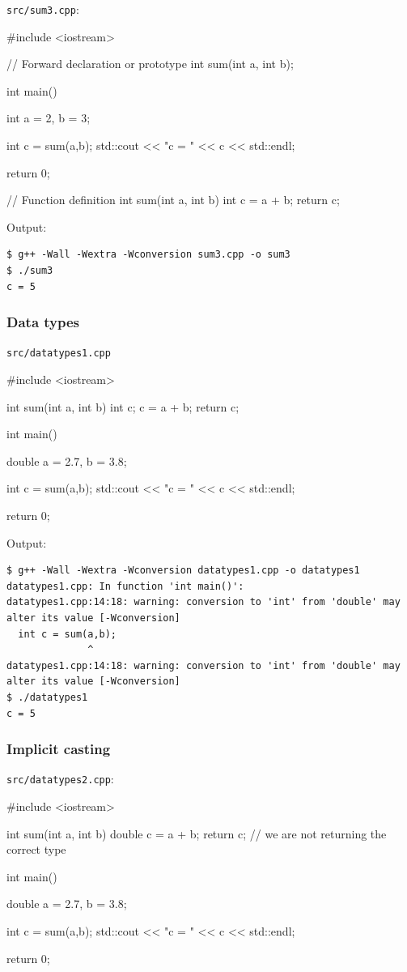 \documentclass[12pt,letterpaper,twoside]{article}
\begin{document}
\texttt{src/sum3.cpp}:

\begin{cpp}
#include <iostream>

// Forward declaration or prototype
int sum(int a, int b);

int main() {
  int a = 2, b = 3;
  
  int c = sum(a,b);
  std::cout << "c = " << c << std::endl;
  
  return 0;
}

// Function definition
int sum(int a, int b) {
  int c = a + b;
  return c;
}
\end{cpp}

Output:

\begin{verbatim}
$ g++ -Wall -Wextra -Wconversion sum3.cpp -o sum3
$ ./sum3
c = 5
\end{verbatim}

\subsubsection{Data types}
\texttt{src/datatypes1.cpp}

\begin{cpp}
#include <iostream>

int sum(int a, int b) {
  int c;
  c = a + b;
  return c;
}

int main() {
  double a = 2.7, b = 3.8;

  int c = sum(a,b);
  std::cout << "c = " << c << std::endl;

  return 0;
}
\end{cpp}

Output:

\begin{verbatim}
$ g++ -Wall -Wextra -Wconversion datatypes1.cpp -o datatypes1
datatypes1.cpp: In function 'int main()':
datatypes1.cpp:14:18: warning: conversion to 'int' from 'double' may alter its value [-Wconversion]
  int c = sum(a,b);
              ^
datatypes1.cpp:14:18: warning: conversion to 'int' from 'double' may alter its value [-Wconversion]
$ ./datatypes1
c = 5
\end{verbatim}

\subsubsection{Implicit casting}
\texttt{src/datatypes2.cpp}:

\begin{cpp}
#include <iostream>

int sum(int a, int b) {
  double c = a + b;
  return c; // we are not returning the correct type
}

int main() {
  double a = 2.7, b = 3.8;

  int c = sum(a,b);
  std::cout << "c = " << c << std::endl;

  return 0;
}
\end{cpp}
\end{document}

